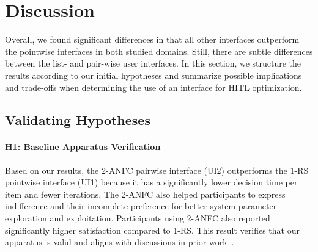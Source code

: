 \documentclass[acmsmall,screen,nonacm]{acmart}
\begin{document}
%

\section{Discussion}
Overall, we found significant differences in that all other interfaces outperform the pointwise interfaces in both studied domains. Still, there are subtle differences between the list- and pair-wise user interfaces. In this section, we structure the results according to our initial hypotheses and summarize possible implications and trade-offs when determining the use of an interface for HITL optimization.

\subsection{Validating Hypotheses}
\paragraph{H1: Baseline Apparatus Verification}
Based on our results, the 2-ANFC pairwise interface (UI2) outperforms the 1-RS pointwise interface (UI1) because it has a significantly lower decision time per item and fewer iterations. The 2-ANFC also helped participants to express indifference and their incomplete preference for better system parameter exploration and exploitation.
%
Participants using 2-ANFC also reported significantly higher satisfaction compared to 1-RS. This result verifies that our apparatus is valid and aligns with discussions in prior work~\cite{brochu2007active, brochu2007material-design, brochu2010animation}.
\end{document}
